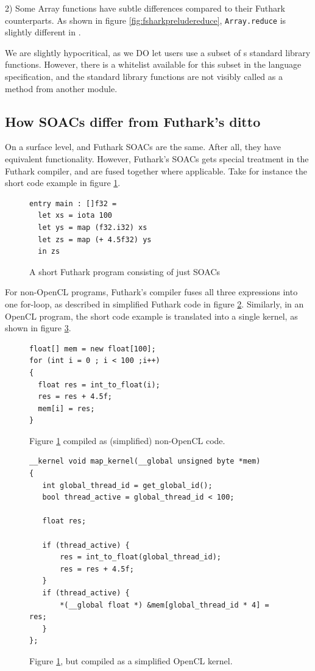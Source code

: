 2) Some Array functions have subtle differences compared to their
Futhark counterparts. As shown in figure \ref{fig:fsharkpreludereduce},
\texttt{Array.reduce} is slightly different in \fsharp{}.

We are slightly hypocritical, as we DO let users use a subset of \fsharp{}s
standard library functions. However, there is a whitelist available for this
subset in the \fshark{} language specification, and the standard library
functions are not visibly called as a method from another module.

\subsection*{How \fshark{} SOACs differ from Futhark's ditto}
On a surface level, \fshark{} and Futhark SOACs are the same. After all, they
have equivalent functionality.
However, Futhark's SOACs gets special treatment in the Futhark compiler, and are
fused together where applicable.
Take for instance the short code example in figure \ref{fig:futharkfusion}.

\begin{figure}[h]
  \centering
\begin{lstlisting}[language=Futhark]
entry main : []f32 =
  let xs = iota 100
  let ys = map (f32.i32) xs
  let zs = map (+ 4.5f32) ys
  in zs
\end{lstlisting}
  \caption{A short Futhark program consisting of just SOACs}
  \label{fig:futharkfusion}
\end{figure}

For non-OpenCL programs, Futhark's compiler fuses all three expressions into one for-loop, as described
in simplified Futhark \csharp{} code in figure \ref{fig:pseudofusion}.
Similarly, in an OpenCL program, the short code example is translated into a
single kernel, as shown in figure \ref{fig:pseudokernel}.

\begin{figure}[h]
  \centering
\begin{verbatim}
float[] mem = new float[100];
for (int i = 0 ; i < 100 ;i++)
{
  float res = int_to_float(i);
  res = res + 4.5f;
  mem[i] = res;
}
\end{verbatim}
  \caption{Figure \ref{fig:futharkfusion} compiled as (simplified) non-OpenCL
    \csharp{} code.}
  \label{fig:pseudofusion}
\end{figure}

\begin{figure}
  \centering
\begin{verbatim}
__kernel void map_kernel(__global unsigned byte *mem)
{
   int global_thread_id = get_global_id();
   bool thread_active = global_thread_id < 100;

   float res;

   if (thread_active) {
       res = int_to_float(global_thread_id);
       res = res + 4.5f;
   }
   if (thread_active) {
       *(__global float *) &mem[global_thread_id * 4] = res;
   }
};
\end{verbatim}
  \caption{Figure \ref{fig:futharkfusion}, but compiled as a simplified OpenCL kernel.}
  \label{fig:pseudokernel}
\end{figure}


